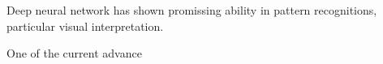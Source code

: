 Deep neural network has shown promissing ability in pattern recognitions, particular visual interpretation.
\par 

One of the current advance